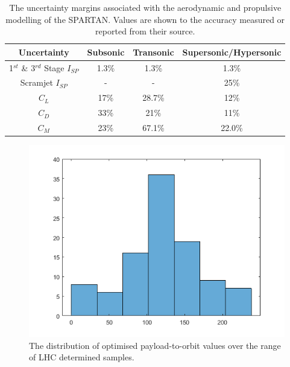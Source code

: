 
\begin{table}[ht]
	\centering
	\begin{tabular}{|c|c|c|c|}
		\hline  Uncertainty & Subsonic & Transonic  & Supersonic/Hypersonic \\ 
		\hline  1$^{st}$ \& 3$^{rd}$ Stage $I_{SP}$ & 1.3\% & 1.3\% &  1.3\% \\ 
		\hline  Scramjet $I_{SP}$ & - & - &  25\% \\ 
		\hline   $C_L$ & 17\% & 28.7\% & 12\% \\  
		\hline   $C_D$ & 33\% & 21\% & 11\% \\  
		\hline   $C_M$  & 23\% & 67.1\% &  22.0\% \\ 
		\hline 
	\end{tabular}
	\caption{The uncertainty margins associated with the aerodynamic and propulsive modelling of the SPARTAN. Values are shown to the accuracy measured or reported from their source.}
	\label{tab:AppendixUncertainty}
\end{table}



\begin{figure}[ht]
	\centering
	\includegraphics[width=0.7\linewidth]{figures/A1_uncertainty-analysis/LHC}
	\caption{The distribution of optimised payload-to-orbit values over the range of LHC determined samples.}
	\label{fig:LHC-17bins}
\end{figure}

